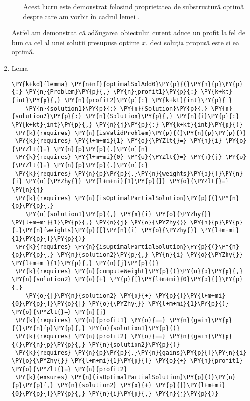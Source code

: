 \begin{sloppypar}
\begin{enumerate}
\begin{itemize}
         Acest lucru este demonstrat folosind proprietatea de substructură optimă despre care am vorbit în cadrul lemei .
     \end{itemize}
     Astfel am demonstrat că adăugarea obiectului curent aduce un profit la fel de bun ca cel al unei soluții presupuse optime $x$, deci soluția propusă este și ea optimă.
     \item Lema 
     \begin{Verbatim}[commandchars=\\\{\}]
\PY{k+kd}{lemma} \PY{n+nf}{optimalSolAdd0}\PY{p}{(}\PY{n}{p}\PY{p}{:} \PY{n}{Problem}\PY{p}{,} \PY{n}{profit1}\PY{p}{:} \PY{k+kt}{int}\PY{p}{,} \PY{n}{profit2}\PY{p}{:} \PY{k+kt}{int}\PY{p}{,} 
    \PY{n}{solution1}\PY{p}{:} \PY{n}{Solution}\PY{p}{,} \PY{n}{solution2}\PY{p}{:} \PY{n}{Solution}\PY{p}{,} \PY{n}{i}\PY{p}{:} \PY{k+kt}{int}\PY{p}{,} \PY{n}{j}\PY{p}{:} \PY{k+kt}{int}\PY{p}{)}
 \PY{k}{requires} \PY{n}{isValidProblem}\PY{p}{(}\PY{n}{p}\PY{p}{)}
 \PY{k}{requires} \PY{l+m+mi}{1} \PY{o}{\PYZlt{}=} \PY{n}{i} \PY{o}{\PYZlt{}=} \PY{n}{p}\PY{p}{.}\PY{n}{n}
 \PY{k}{requires} \PY{l+m+mi}{0} \PY{o}{\PYZlt{}=} \PY{n}{j} \PY{o}{\PYZlt{}=} \PY{n}{p}\PY{p}{.}\PY{n}{c}
 \PY{k}{requires} \PY{n}{p}\PY{p}{.}\PY{n}{weights}\PY{p}{[}\PY{n}{i} \PY{o}{\PYZhy{}} \PY{l+m+mi}{1}\PY{p}{]} \PY{o}{\PYZlt{}=} \PY{n}{j}
 \PY{k}{requires} \PY{n}{isOptimalPartialSolution}\PY{p}{(}\PY{n}{p}\PY{p}{,} 
    \PY{n}{solution1}\PY{p}{,} \PY{n}{i} \PY{o}{\PYZhy{}} \PY{l+m+mi}{1}\PY{p}{,} \PY{n}{j} \PY{o}{\PYZhy{}} \PY{n}{p}\PY{p}{.}\PY{n}{weights}\PY{p}{[}\PY{n}{i} \PY{o}{\PYZhy{}} \PY{l+m+mi}{1}\PY{p}{]}\PY{p}{)}
 \PY{k}{requires} \PY{n}{isOptimalPartialSolution}\PY{p}{(}\PY{n}{p}\PY{p}{,} \PY{n}{solution2}\PY{p}{,} \PY{n}{i} \PY{o}{\PYZhy{}} \PY{l+m+mi}{1}\PY{p}{,} \PY{n}{j}\PY{p}{)}
 \PY{k}{requires} \PY{n}{computeWeight}\PY{p}{(}\PY{n}{p}\PY{p}{,} \PY{n}{solution2} \PY{o}{+} \PY{p}{[}\PY{l+m+mi}{0}\PY{p}{]}\PY{p}{,} 
    \PY{o}{|}\PY{n}{solution2} \PY{o}{+} \PY{p}{[}\PY{l+m+mi}{0}\PY{p}{]}\PY{o}{|} \PY{o}{\PYZhy{}} \PY{l+m+mi}{1}\PY{p}{)} \PY{o}{\PYZlt{}=} \PY{n}{j}
 \PY{k}{requires} \PY{n}{profit1} \PY{o}{==} \PY{n}{gain}\PY{p}{(}\PY{n}{p}\PY{p}{,} \PY{n}{solution1}\PY{p}{)}
 \PY{k}{requires} \PY{n}{profit2} \PY{o}{==} \PY{n}{gain}\PY{p}{(}\PY{n}{p}\PY{p}{,} \PY{n}{solution2}\PY{p}{)}
 \PY{k}{requires} \PY{n}{p}\PY{p}{.}\PY{n}{gains}\PY{p}{[}\PY{n}{i} \PY{o}{\PYZhy{}} \PY{l+m+mi}{1}\PY{p}{]} \PY{o}{+} \PY{n}{profit1} \PY{o}{\PYZlt{}=} \PY{n}{profit2}
 \PY{k}{ensures} \PY{n}{isOptimalPartialSolution}\PY{p}{(}\PY{n}{p}\PY{p}{,} \PY{n}{solution2} \PY{o}{+} \PY{p}{[}\PY{l+m+mi}{0}\PY{p}{]}\PY{p}{,} \PY{n}{i}\PY{p}{,} \PY{n}{j}\PY{p}{)}

\end{Verbatim}
\end{enumerate}
\end{sloppypar}
